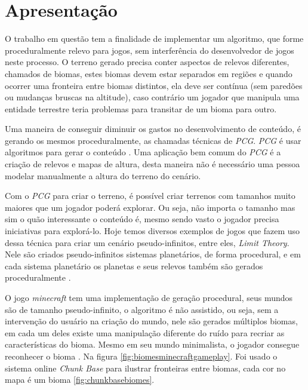 \section{Apresentação}
O trabalho em questão tem a finalidade de implementar um algoritmo,
que forme proceduralmente relevo para jogos, sem 
interferência do desenvolvedor de jogos neste processo.
O terreno gerado precisa conter aspectos de relevos diferentes, chamados de biomas,
estes biomas devem estar separados em regiões e quando ocorrer uma fronteira
entre biomas distintos, ela deve ser contínua (sem paredões ou mudanças bruscas na altitude),
caso contrário um jogador que manipula uma entidade terrestre teria problemas para 
transitar de um bioma para outro.

Uma maneira de conseguir diminuir os gastos no desenvolvimento de conteúdo, é 
gerando os mesmos proceduralmente, as chamadas técnicas de \textit{PCG}. 
\textit{PCG} é usar algoritmos para gerar o conteúdo \cite{shaker2016procedural}.
Uma aplicação bem comum do \textit{PCG} é a criação de relevos e mapas de altura,
desta maneira não é necessário uma pessoa modelar manualmente a altura do
terreno do cenário.

Com o \textit{PCG} para criar o terreno, é possível criar terrenos com tamanhos
muito maiores que um jogador poderá explorar. Ou seja, não importa o tamanho mas
sim o quão interessante o conteúdo é, mesmo sendo vasto o jogador precisa iniciativas
para explorá-lo.
Hoje temos diversos exemplos de jogos que fazem uso dessa técnica
para criar um cenário pseudo-infinitos, entre eles, \textit{Limit Theory}. Nele
são criados pseudo-infinitos sistemas planetários, de forma procedural, e em cada
sistema planetário os planetas e seus relevos também são gerados proceduralmente
\cite{abreu1990toward}.

O jogo \textit{minecraft} tem uma implementação de geração procedural,
seus mundos são de tamanho pseudo-infinito, 
o algoritmo é não assistido, ou seja, sem a intervenção
do usuário na criação do mundo, nele
são gerados múltiplos biomas, em cada um deles existe uma manipulação diferente
do ruído para recriar as características do bioma. Mesmo em seu mundo
minimalista, o jogador consegue reconhecer o bioma \cite{short2012teaching}.
Na figura \ref{fig:biomesminecraftgameplay}.
Foi usado o sistema online \textit{Chunk Base} para 
ilustrar fronteiras entre biomas, cada cor no mapa é um bioma \ref{fig:chunkbasebiomes}.


